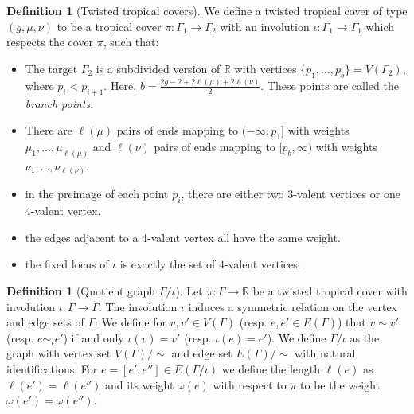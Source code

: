 \documentclass[11pt]{article}
\theoremstyle{definition}
\newtheorem{defi}[theo]{Definition}
\numberwithin{equation}{section}
\begin{document}
\begin{defi}[Twisted tropical covers]\label{def-twistedtropcover}
We define a twisted tropical cover of type $(g,\mu,\nu)$ to be a tropical cover $\pi\colon\Gamma_1\to\Gamma_2$ with an involution $\iota\colon\Gamma_1\to\Gamma_1$ which respects the cover $\pi$, such that:
\begin{itemize}
    \item The target $\Gamma_2$ is a subdivided version of $\mathbb{R}$ with vertices $\{p_1,\dots,p_b\}=V(\Gamma_2)$, where $p_i<p_{i+1}$. Here, $b=\frac{2g-2+2\ell(\mu)+2\ell(\nu)}{2}$. These points are called the \emph{branch points}.
    \item There are $\ell(\mu)$ pairs of ends mapping to $(-\infty,p_1]$ with weights $\mu_1,\dots,\mu_{\ell(\mu)}$ and $\ell(\nu)$ pairs of ends mapping to $[p_b,\infty)$ with weights $\nu_1,\ldots,\nu_{\ell(\nu)}$.
    \item in the preimage of each point $p_i$, there are either two $3$-valent vertices or one $4$-valent vertex.
    \item the edges adjacent to a $4$-valent vertex all have the same weight.
    \item the fixed locus of $\iota$ is exactly the set of $4$-valent vertices.
\end{itemize}
\end{defi}

\begin{defi}[Quotient graph $\Gamma/\iota$]
Let $\pi\colon \Gamma\to \mathbb{R}$ be a twisted tropical cover with involution $\iota\colon\Gamma\to\Gamma$. The involution $\iota$ induces a symmetric relation on the vertex and edge sets of $\Gamma$: We define for $v,v'\in V(\Gamma)$  (resp. $e,e'\in E(\Gamma)$) that $v\sim v'$ (resp. $e\sim_\iota e'$) if and only $\iota(v)=v'$ (resp. $\iota(e)=e'$). We define $\Gamma/\iota$ as the graph with vertex set $V(\Gamma)/\sim$ and edge set $E(\Gamma)/\sim$ with natural identifications. For $e=[e',e'']\in E(\Gamma/\iota)$ we define the length $\ell(e)$ as $\ell(e')=\ell(e'')$ and its weight $\omega(e)$ with respect to $\pi$ to be the weight $\omega(e')=\omega(e'')$.
\end{defi}
\end{document}
